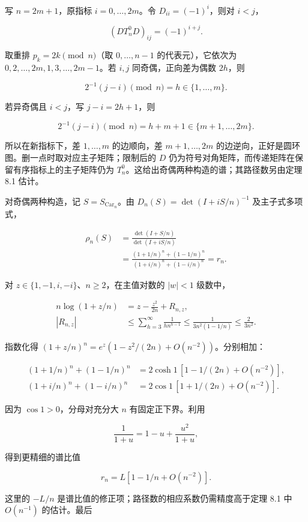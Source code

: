 \documentclass[11pt,a4paper]{article}
\begin{document}
写 \(n=2m+1\)，原指标 \(i=0,\ldots,2m\)。令 \(D_{ii}=(-1)^i\)，则对 \(i<j\)，

\[
(DT_n^0D)_{ij}=(-1)^{i+j}.
\]

取重排 \(p_k=2k\pmod n\)（取 \(0,\ldots,n-1\) 的代表元），它依次为 \(0,2,\ldots,2m,1,3,\ldots,2m-1\)。若 \(i,j\) 同奇偶，正向差为偶数 \(2h\)，则

\[
2^{-1}(j-i)\pmod n=h\in\{1,\ldots,m\}.
\]

若异奇偶且 \(i<j\)，写 \(j-i=2h+1\)，则

\[
2^{-1}(j-i)\pmod n=h+m+1\in\{m+1,\ldots,2m\}.
\]

所以在新指标下，差 \(1,\ldots,m\) 的边顺向，差 \(m+1,\ldots,2m\) 的边逆向，正好是圆环图。删一点时取对应主子矩阵；限制后的 \(D\) 仍为符号对角矩阵，而传递矩阵在保留有序指标上的主子矩阵仍为 \(T_n^0\)。这给出奇偶两种构造的谱；其路径数另由定理 8.1 估计。

对奇偶两种构造，记 \(S=S_{\mathrm{Car}_n}\)。由 \(D_n(S)=\det(I+iS/n)^{-1}\) 及主子式多项式，

\[
\begin{aligned}
\rho_n(S)&=\frac{\det(I+S/n)}{\det(I+iS/n)}\\
&=\frac{(1+1/n)^n+(1-1/n)^n}
{(1+i/n)^n+(1-i/n)^n}=r_n.
\end{aligned}
\]

对 \(z\in\{1,-1,i,-i\}\)、\(n\ge2\)，在主值对数的 \(|w|<1\) 级数中，

\[
\begin{aligned}
n\log(1+z/n)&=z-\frac{z^2}{2n}+R_{n,z},\\
|R_{n,z}|&\le\sum_{h=3}^{\infty}\frac1{h n^{h-1}}
\le\frac1{3n^2(1-1/n)}\le\frac2{3n^2}.
\end{aligned}
\]

指数化得 \((1+z/n)^n=e^z(1-z^2/(2n)+O(n^{-2}))\)。分别相加：

\[
\begin{aligned}
(1+1/n)^n+(1-1/n)^n&=2\cosh1\,[1-1/(2n)+O(n^{-2})],\\
(1+i/n)^n+(1-i/n)^n&=2\cos1\,[1+1/(2n)+O(n^{-2})].
\end{aligned}
\]

因为 \(\cos1>0\)，分母对充分大 \(n\) 有固定正下界。利用

\[
\frac1{1+u}=1-u+\frac{u^2}{1+u},
\]

得到更精细的谱比值

\[
r_n=L[1-1/n+O(n^{-2})].
\]

这里的 \(-L/n\) 是谱比值的修正项；路径数的相应系数仍需精度高于定理 8.1 中 \(O(n^{-1})\) 的估计。最后
\end{document}

